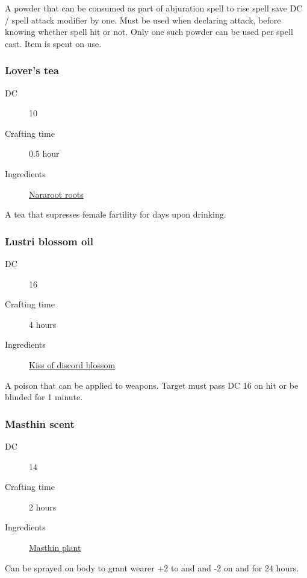 A powder that can be consumed as part of abjuration spell to rise spell save DC / spell attack modifier by one. Must be used when declaring attack, before knowing whether spell hit or not. Only one such powder can be used per spell cast. Item is spent on use.

\subsubsection{Lover's tea}
\label{Lover's tea}

\begin{description}
\item [DC] 10 \medicine
\item [Crafting time] 0.5 hour
\item [Ingredients] \hyperref[Nararoot]{Nararoot roots}
\end{description}

A tea that supresses female fartility for  days upon drinking.

\subsubsection{Lustri blossom oil}
\label{Lustri blossom oil}

\begin{description}
\item [DC] 16 \nature
\item [Crafting time] 4 hours
\item [Ingredients] \hyperref[Kiss of Discord]{Kiss of discord blossom}
\end{description}

A poison that can be applied to weapons. Target must pass DC 16 \constitutionsave on hit or be blinded for 1 minute.

\subsubsection{Masthin scent}
\label{Masthin scent}

\begin{description}
\item [DC] 14 \survival
\item [Crafting time] 2 hours
\item [Ingredients] \hyperref[Masthin]{Masthin plant}
\end{description}

Can be sprayed on body to grant wearer +2 to \animalhandling and \intimidation 
and -2 on \persuasion and \performance for 24 hours.

